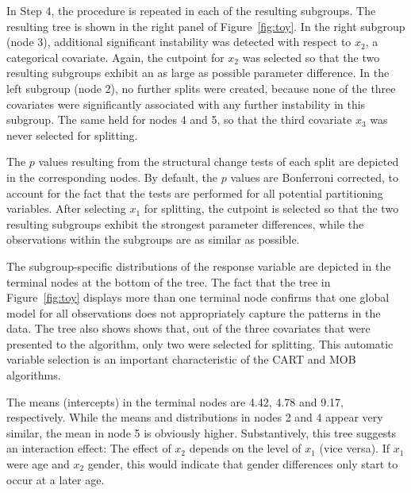 \documentclass[doc,floatsintext,natbib]{apa7}
\begin{document}
In Step 4, the procedure is repeated in each of the resulting subgroups. The resulting tree is shown in the right panel of Figure~\ref{fig:toy}. In the right subgroup (node 3), additional significant instability was detected with respect to $x_2$, a categorical covariate. Again, the cutpoint for $x_2$ was selected so that the two resulting subgroups exhibit an as large as possible parameter difference. In the left subgroup (node 2), no further splits were created, because none of the three covariates were significantly associated with any further instability in this subgroup. The same held for nodes 4 and 5, so that the third covariate $x_3$ was never selected for splitting. 

The $p$ values resulting from the structural change tests of each split are depicted in the corresponding nodes. By default, the $p$ values are Bonferroni corrected, to account for the fact that the tests are performed for all potential partitioning variables. After selecting $x_1$ for splitting, the cutpoint is selected so that the two resulting subgroups exhibit the strongest parameter differences, while the observations within the subgroups are as similar as possible.

The subgroup-specific distributions of the response variable are depicted in the terminal nodes at the bottom of the tree. The fact that the tree in Figure~\ref{fig:toy} displays more than one terminal node confirms that one global model for all observations does not appropriately capture the patterns in the data.  The tree also shows shows that, out of the three covariates that were presented to the algorithm, only two were selected for splitting. This automatic variable selection is an important characteristic of the CART and MOB algorithms. 

The means (intercepts) in the terminal nodes are 4.42, 4.78 and 9.17, respectively. While the means and distributions in nodes 2 and 4 appear very similar, the mean in node 5 is obviously higher. Substantively, this tree suggests an interaction effect: The effect of $x_2$ depends on the level of $x_1$ (vice versa). If $x_1$ were age and $x_2$ gender, this would indicate that gender differences only start to occur at a later age.   


\end{document}
